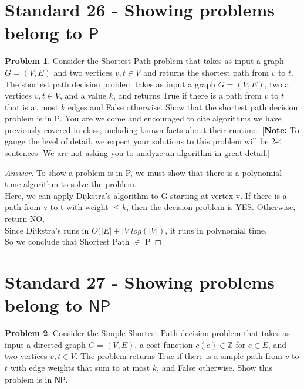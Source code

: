 \documentclass[11pt]{article}
\theoremstyle{definition}
\theoremstyle{definition}
\newtheorem{required}{Problem}
\theoremstyle{definition}
\begin{document}
\newpage
\section{Standard 26 - Showing problems belong to $\textsf{P}$}
\begin{required} \label{InP}
Consider the Shortest Path problem that takes as input a graph $G=(V,E)$
and two vertices $v,t\in V$ and returns the shortest path from $v$ to $t$.
The shortest path decision problem takes as input a graph $G=(V,E)$, two a
vertices $v,t\in V$, and a value $k$, and returns True if there is a path from
$v$ to $t$ that is at most $k$ edges and False otherwise. Show that the
shortest path decision problem is in $\textsf{P}$. You are welcome and
encouraged to cite algorithms we have previously covered in class, including
known facts about their runtime.  [\textbf{Note:} To gauge the level of
detail, we expect your solutions to this problem will be 2-4 sentences. We are
not asking you to analyze an algorithm in great detail.]

\end{required}
\begin{proof}[Answer]
To show a problem is in P, we must show that there is a polynomial time algorithm to solve the problem. \\
Here, we can apply Dijkstra's algorithm to G starting at vertex v. If there is a path from v to t with weight $\leq k$, then the decision problem is YES. Otherwise, return NO. \\

Since Dijkstra's runs in $O(|E| + |V|log(|V|)$, it runs in polynomial time.\\

So we conclude that Shortest Path $\in$ P
\end{proof}


\newpage
\section{Standard 27 - Showing problems belong to $\textsf{NP}$}
\begin{required} \label{InNP}
Consider the Simple Shortest Path decision problem that takes as input a
directed graph $G=(V,E)$, a cost function $c(e)\in \mathbb{Z}$ for $e \in E$,
and two vertices $v,t\in V$. The problem returns True if there is a simple path from
$v$ to $t$ with edge weights that sum to at most $k$, and False otherwise.
Show this problem is in $\textsf{NP}$.
\end{required}
\end{document}
